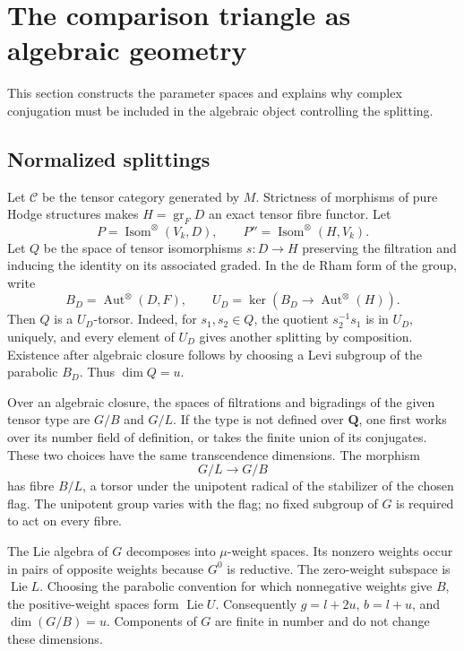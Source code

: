 \documentclass[11pt]{article}
\theoremstyle{definition}\newtheorem{definition}[theorem]{Definition}
\theoremstyle{remark}\newtheorem{remark}[theorem]{Remark}
\newcommand{\Q}{\mathbf Q}\newcommand{\Z}{\mathbf Z}
\DeclareMathOperator{\Aut}{Aut}\DeclareMathOperator{\Isom}{Isom}
\DeclareMathOperator{\Lie}{Lie}\DeclareMathOperator{\trdeg}{trdeg}
\DeclareMathOperator{\gr}{gr}\DeclareMathOperator{\GL}{GL}
\begin{document}
\section{The comparison triangle as algebraic geometry}
This section constructs the parameter spaces and explains why complex conjugation must be included in the algebraic object controlling the splitting.

\subsection{Normalized splittings}
Let $\mathcal C$ be the tensor category generated by $M$. Strictness of morphisms of pure Hodge structures makes $H=\gr_FD$ an exact tensor fibre functor. Let
\[
 P=\Isom^{\otimes}(V_k,D),\qquad
 P''=\Isom^{\otimes}(H,V_k).
\]
Let $Q$ be the space of tensor isomorphisms $s:D\to H$ preserving the filtration and inducing the identity on its associated graded. In the de Rham form of the group, write
\[
 B_D=\Aut^{\otimes}(D,F),\qquad
 U_D=\ker(B_D\to\Aut^{\otimes}(H)).
\]
Then $Q$ is a $U_D$-torsor. Indeed, for $s_1,s_2\in Q$, the quotient $s_2^{-1}s_1$ is in $U_D$, uniquely, and every element of $U_D$ gives another splitting by composition. Existence after algebraic closure follows by choosing a Levi subgroup of the parabolic $B_D$. Thus $\dim Q=u$.

Over an algebraic closure, the spaces of filtrations and bigradings of the given tensor type are $G/B$ and $G/L$. If the type is not defined over $\Q$, one first works over its number field of definition, or takes the finite union of its conjugates. These two choices have the same transcendence dimensions. The morphism
\[
                       G/L\longrightarrow G/B
\]
has fibre $B/L$, a torsor under the unipotent radical of the stabilizer of the chosen flag. The unipotent group varies with the flag; no fixed subgroup of $G$ is required to act on every fibre.

The Lie algebra of $G$ decomposes into $\mu$-weight spaces. Its nonzero weights occur in pairs of opposite weights because $G^0$ is reductive. The zero-weight subspace is $\Lie L$. Choosing the parabolic convention for which nonnegative weights give $B$, the positive-weight spaces form $\Lie U$. Consequently $g=l+2u$, $b=l+u$, and $\dim(G/B)=u$. Components of $G$ are finite in number and do not change these dimensions.
\end{document}
